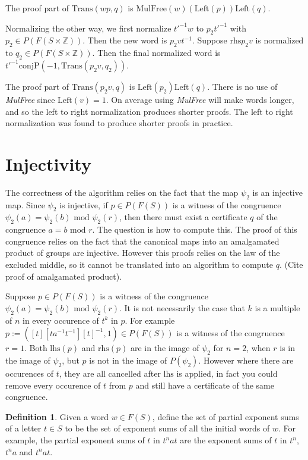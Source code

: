 \documentclass[11pt]{article} %
\theoremstyle{definition}
\theoremstyle{definition}
\theoremstyle{definition}
\theoremstyle{definition}
\theoremstyle{definition}
\newtheorem{defn}[theorem]{Definition}
\theoremstyle{definition}
\begin{document}
The proof part of $\text{Trans}(wp, q)$ is $\text{MulFree}(w)(\text{Left}(p))\text{Left}(q)$.

Normalizing the other way, we first normalize $t'^{-1}w$ to $p_2 t'^{-1}$ with
$p_2 \in P(F(S \times \mathbb{Z}))$. Then the new word is $p_2vt^{-1}$. Suppose
$\text{rhs} p_2 v$ is normalized to $q_2 \in P(F(S \times \mathbb{Z}))$.
Then the final normalized word is $t'^{-1}\text{conjP}(-1, \text{Trans} (p_2v, q_2))$.

The proof part of $\text{Trans} (p_2v, q)$ is $\text{Left}(p_2)\text{Left}(q)$. There is no
use of \textit{MulFree} since $\text{Left}(v)=1$. On average using \textit{MulFree}
will make words longer, and so the left to right normalization produces shorter proofs.
The left to right normalization was found to produce shorter proofs in practice.

\section{Injectivity}

The correctness of the algorithm relies on the fact that the map $\psi_2$ is an injective map.
Since $\psi_2$ is injective, if $p \in P(F(S))$ is a witness of the congruence
$\psi_2(a) = \psi_2(b) \text{ mod } \psi_2(r)$, then there must exist a certificate
$q$ of the congruence $a = b \text{ mod }r$. The question is how to compute this. The proof
of this congruence relies on the fact that the canonical maps into an amalgamated product
of groups are injective. However this proofs relies on the law of the excluded middle, so
it cannot be translated into an algorithm to compute $q$. (Cite proof of amalgamated product).

Suppose $p \in P(F(S))$ is a witness of the congruence
$\psi_2(a) = \psi_2(b) \text{ mod } \psi_2(r)$. It is not necessarily the case that $k$
is a multiple of $n$ in every occurence of $t^k$ in $p$. For example
$p := ([t][ta^{-1}t^{-1}][t]^{-1}, 1) \in P(F(S))$ is a witness of the congruence
$r = 1$. Both $\text{lhs}(p)$ and $\text{rhs}(p)$ are in the image of
$\psi_2$ for $n = 2$, when $r$ is in the image of $\psi_2$,
but $p$ is not in the image of $P(\psi_2)$. However where there are
occurences of $t$, they are all cancelled after $\text{lhs}$ is applied, in fact
you could remove every occurence of $t$ from $p$ and still have a certificate of the same
congruence.

\begin{defn}
  Given a word $w \in F(S)$, define the set of partial exponent sums of a letter $t \in S$ to
  be the set of exponent sums of all the initial words of $w$. For example, the partial
  exponent sums of $t$ in $t^n a t$ are the exponent sums of $t$ in
  $t^n$, $t^na$ and $t^nat$.
\end{defn}
\end{document}
